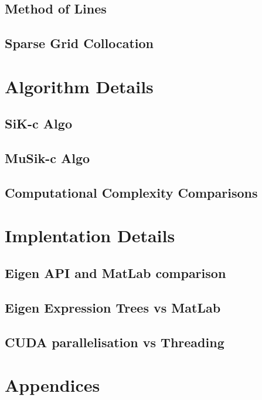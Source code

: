 \documentclass[a4paper]{amsart}
\begin{document}
\subsection{Method of Lines}

\subsection{Sparse Grid Collocation}

 

\section{Algorithm Details}

\subsection{SiK-c Algo}

\subsection{MuSik-c Algo}

\subsection{Computational Complexity Comparisons}

 

\section{Implentation Details}

\subsection{Eigen API and MatLab comparison}

\subsection{Eigen Expression Trees vs MatLab}

\subsection{CUDA parallelisation vs Threading}


\section{Appendices}
\end{document}

